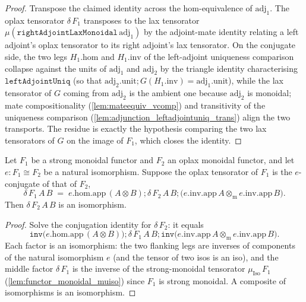\begin{proof}
  \leanok
  Transpose the claimed identity across the hom-equivalence of \(\mathrm{adj}_1\). The oplax
  tensorator \(\delta\,F_1\) transposes to the lax tensorator
  \(\mu(\mathtt{rightAdjointLaxMonoidal}\,\mathrm{adj}_1)\) by the adjoint-mate identity relating a
  left adjoint's oplax tensorator to its right adjoint's lax tensorator. On the conjugate side, the
  two legs \(H_1.\mathrm{hom}\) and \(H_1.\mathrm{inv}\) of the left-adjoint uniqueness comparison
  collapse against the units of \(\mathrm{adj}_1\) and \(\mathrm{adj}_2\) by the triangle identity
  characterising \(\mathtt{leftAdjointUniq}\) (so that
  \(\mathrm{adj}_2.\mathrm{unit} \mathbin{;} G(H_1.\mathrm{inv}) = \mathrm{adj}_1.\mathrm{unit}\)),
  while the lax tensorator of \(G\) coming from \(\mathrm{adj}_2\) is the ambient one because
  \(\mathrm{adj}_2\) is monoidal; mate compositionality
  (\cref{lem:mateequiv_vcomp}) and transitivity of the uniqueness comparison
  (\cref{lem:adjunction_leftadjointuniq_trans}) align the two transports. The residue is exactly the
  hypothesis comparing the two lax tensorators of \(G\) on the image of \(F_1\), which closes the
  identity.
\end{proof}

\begin{lemma}\leanok
  \label{lem:isiso_oplaxdelta_of_conj}
  Let \(F_1\) be a strong monoidal functor and \(F_2\) an oplax monoidal functor, and let
  \(e : F_1 \cong F_2\) be a natural isomorphism. Suppose the oplax tensorator of \(F_1\) is the
  \(e\)-conjugate of that of \(F_2\),
  \[
    \delta\,F_1\,A\,B
      \;=\; e.\mathrm{hom}.\mathrm{app}\,(A \otimes B)
        \mathbin{;} \delta\,F_2\,A\,B
        \mathbin{;} \bigl(e.\mathrm{inv}.\mathrm{app}\,A \otimes_{\mathrm m}
          e.\mathrm{inv}.\mathrm{app}\,B\bigr).
  \]
  Then \(\delta\,F_2\,A\,B\) is an isomorphism.
\end{lemma}
\begin{proof}
  \leanok
  Solve the conjugation identity for \(\delta\,F_2\): it equals
  \[
    \mathtt{inv}\bigl(e.\mathrm{hom}.\mathrm{app}\,(A \otimes B)\bigr)
      \mathbin{;} \delta\,F_1\,A\,B
      \mathbin{;} \mathtt{inv}\bigl(e.\mathrm{inv}.\mathrm{app}\,A \otimes_{\mathrm m}
        e.\mathrm{inv}.\mathrm{app}\,B\bigr).
  \]
  Each factor is an isomorphism: the two flanking legs are inverses of components of the natural
  isomorphism \(e\) (and the tensor of two isos is an iso), and the middle factor \(\delta\,F_1\) is
  the inverse of the strong-monoidal tensorator \(\mu_{\mathrm{Iso}}\,F_1\)
  (\cref{lem:functor_monoidal_muiso}) since \(F_1\) is strong monoidal. A composite of isomorphisms
  is an isomorphism.
\end{proof}


